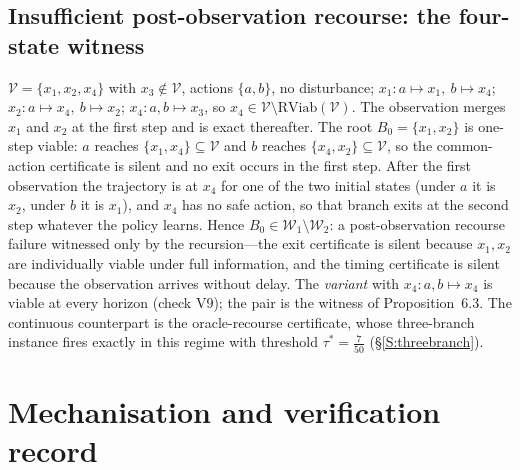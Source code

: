 \documentclass[11pt,a4paper]{article}
\theoremstyle{plain}
\theoremstyle{definition}
\theoremstyle{remark}
\newcommand{\RViab}{\mathrm{RViab}}
\newcommand{\cV}{\mathcal{V}}
\newcommand{\cW}{\mathcal{W}}
\begin{document}
\subsection{Insufficient post-observation recourse: the four-state witness}\label{S:A3}
$\cV=\{x_1,x_2,x_4\}$ with $x_3\notin\cV$, actions $\{a,b\}$, no disturbance; $x_1\colon a\mapsto x_1,\ b\mapsto x_4$; $x_2\colon a\mapsto x_4,\ b\mapsto x_2$; $x_4\colon a,b\mapsto x_3$, so $x_4\in\cV\setminus\RViab(\cV)$. The observation merges $x_1$ and $x_2$ at the first step and is exact thereafter. The root $B_0=\{x_1,x_2\}$ is one-step viable: $a$ reaches $\{x_1,x_4\}\subseteq\cV$ and $b$ reaches $\{x_4,x_2\}\subseteq\cV$, so the common-action certificate is silent and no exit occurs in the first step. After the first observation the trajectory is at $x_4$ for one of the two initial states (under $a$ it is $x_2$, under $b$ it is $x_1$), and $x_4$ has no safe action, so that branch exits at the second step whatever the policy learns. Hence $B_0\in\cW_1\setminus\cW_2$: a post-observation recourse failure witnessed only by the recursion---the exit certificate is silent because $x_1,x_2$ are individually viable under full information, and the timing certificate is silent because the observation arrives without delay. The \emph{variant} with $x_4\colon a,b\mapsto x_4$ is viable at every horizon (check V9); the pair is the witness of Proposition~6.3. The continuous counterpart is the oracle-recourse certificate, whose three-branch instance fires exactly in this regime with threshold $\tau^*=\tfrac7{50}$ (\S\ref{S:threebranch}).
\section{Mechanisation and verification record}\label{S:verification}
\end{document}
